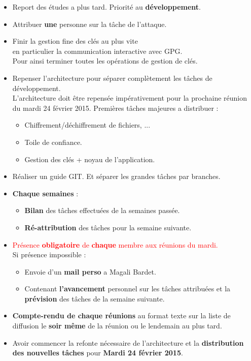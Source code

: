 \documentclass{CR-projet}
\begin{document}
\begin{itemize}
	\item Report des études a plus tard. Priorité au \textbf{développement}.
	\item Attribuer \textbf{une} personne sur la tâche de l'attaque.
	\item Finir la gestion fine des clés au plus vite\\
	en particulier la communication interactive avec GPG.\\
	Pour ainsi terminer toutes les opérations de gestion de clés.
	\item Repenser l'architecture pour séparer complètement les tâches de développement.\\
	L'architecture doit être repensée impérativement pour la prochaine réunion du mardi 24 février 2015.
	Premières tâches majeures a distribuer :
	\begin{itemize}
		\item Chiffrement/déchiffrement de fichiers, ...
		\item Toile de confiance.
		\item Gestion des clés + noyau de l'application.
	\end{itemize}
	\item Réaliser un guide GIT. Et séparer les grandes tâches par branches.
	\item \textbf{Chaque semaines} :
	\begin{itemize}
		\item \textbf{Bilan} des tâches effectuées de la semaines passée.
		\item \textbf{Ré-attribution} des tâches pour la semaine suivante.
	\end{itemize}
	\item \textcolor{red} {Présence \textbf{obligatoire} de \textbf{chaque} membre aux réunions du mardi.}\\
	Si présence impossible :
	\begin{itemize}
		\item Envoie d'un \textbf{mail perso} a Magali Bardet.
		\item Contenant \textbf{l'avancement} personnel sur les tâches attribuées
		et la \textbf{prévision} des tâches de la semaine suivante.  
	\end{itemize}
	\item \textbf{Compte-rendu de chaque réunions} au format texte sur la liste de diffusion
	le \textbf{soir même} de la réunion ou le lendemain au plus tard.
	\item Avoir commencer la refonte nécessaire de l'architecture et la
	\textbf{distribution des nouvelles tâches} pour \textbf{Mardi 24 février 2015}.
\end{itemize}
\end{document}
